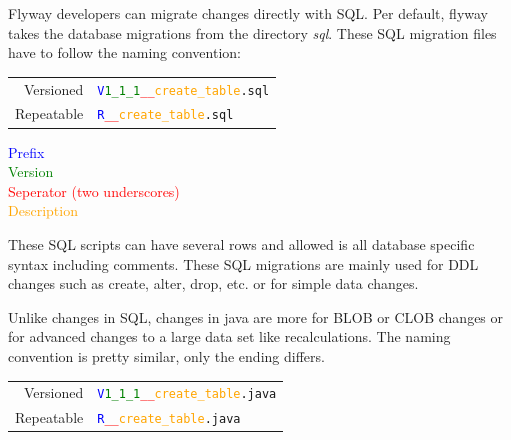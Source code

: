 

%
Flyway developers can migrate changes directly with SQL. Per default, flyway takes the database migrations from the directory \textit{sql}.
These SQL migration files have to follow the naming convention:\\

\begin{center}
\begin{tabularx}{8cm}{r l}
Versioned & \texttt{\textcolor{blue}{V}\textcolor{green}{1\_1\_1}\textcolor{red}{\_\_}\textcolor{orange}{create\_table}.sql}\\
Repeatable & \texttt{\textcolor{blue}{R}\textcolor{red}{\_\_}\textcolor{orange}{create\_table}.sql}\\
\end{tabularx}
\end{center}

\begin{flushright}
\textcolor{blue}{Prefix}\\
\textcolor{green}{Version}\\
\textcolor{red}{Seperator (two underscores)}\\
\textcolor{orange}{Description}\\
\end{flushright}

These SQL scripts can have several rows and allowed is all database specific syntax including comments. These SQL migrations are mainly used for DDL changes such as create, alter, drop, etc. or for simple data changes.

%
Unlike changes in SQL, changes in java are more for BLOB or CLOB changes or for advanced changes to a large data set like recalculations. The naming convention is pretty similar, only the ending differs.\\
\begin{center}
	\begin{tabularx}{8cm}{r l}
		Versioned & \texttt{\textcolor{blue}{V}\textcolor{green}{1\_1\_1}\textcolor{red}{\_\_}\textcolor{orange}{create\_table}.java}\\
		Repeatable & \texttt{\textcolor{blue}{R}\textcolor{red}{\_\_}\textcolor{orange}{create\_table}.java}\\
	\end{tabularx}
\end{center}

